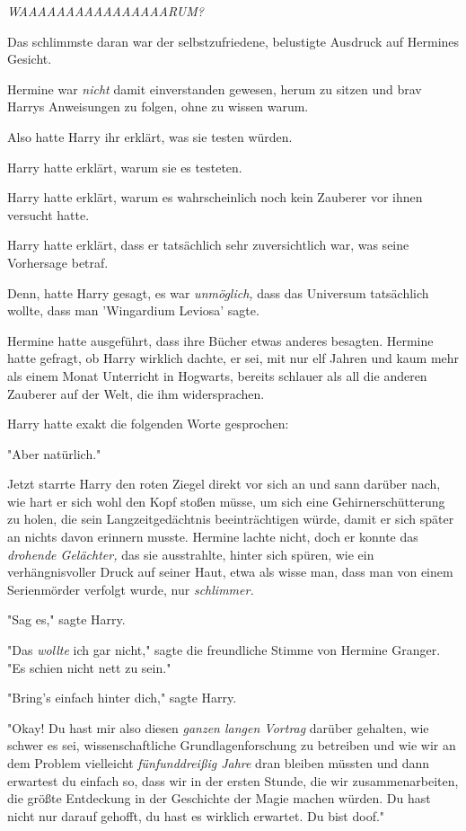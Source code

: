 {\emph{WAAAAAAAAAAAAAAAARUM?}

Das schlimmste daran war der selbstzufriedene, belustigte Ausdruck auf Hermines Gesicht.

Hermine war \emph{nicht} damit einverstanden gewesen, herum zu sitzen und brav Harrys Anweisungen zu folgen, ohne zu wissen warum.

Also hatte Harry ihr erklärt, was sie testen würden.

Harry hatte erklärt, warum sie es testeten.

Harry hatte erklärt, warum es wahrscheinlich noch kein Zauberer vor ihnen versucht hatte.

Harry hatte erklärt, dass er tatsächlich sehr zuversichtlich war, was seine Vorhersage betraf.

Denn, hatte Harry gesagt, es war \emph{unmöglich,} dass das Universum tatsächlich wollte, dass man 'Wingardium Leviosa' sagte.

Hermine hatte ausgeführt, dass ihre Bücher etwas anderes besagten. Hermine hatte gefragt, ob Harry wirklich dachte, er sei, mit nur elf Jahren und kaum mehr als einem Monat Unterricht in Hogwarts, bereits schlauer als all die anderen Zauberer auf der Welt, die ihm widersprachen.

Harry hatte exakt die folgenden Worte gesprochen:

"Aber natürlich."

Jetzt starrte Harry den roten Ziegel direkt vor sich an und sann darüber nach, wie hart er sich wohl den Kopf stoßen müsse, um sich eine Gehirnerschütterung zu holen, die sein Langzeitgedächtnis beeinträchtigen würde, damit er sich später an nichts davon erinnern musste. Hermine lachte nicht, doch er konnte das \emph{drohende Gelächter,} das sie ausstrahlte, hinter sich spüren, wie ein verhängnisvoller Druck auf seiner Haut, etwa als wisse man, dass man von einem Serienmörder verfolgt wurde, nur \emph{schlimmer.}

"Sag es," sagte Harry.

"Das \emph{wollte} ich gar nicht," sagte die freundliche Stimme von Hermine Granger. "Es schien nicht nett zu sein."

"Bring's einfach hinter dich," sagte Harry.

"Okay! Du hast mir also diesen \emph{ganzen langen Vortrag} darüber gehalten, wie schwer es sei, wissenschaftliche Grundlagenforschung zu betreiben und wie wir an dem Problem vielleicht \emph{fünfunddreißig Jahre} dran bleiben müssten und dann erwartest du einfach so, dass wir in der ersten Stunde, die wir zusammenarbeiten, die größte Entdeckung in der Geschichte der Magie machen würden. Du hast nicht nur darauf gehofft, du hast es wirklich erwartet. Du bist doof."

}
